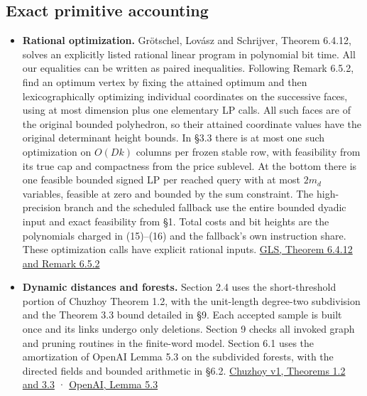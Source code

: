 \documentclass[11pt]{article}
\providecommand{\tightlist}{\setlength{\itemsep}{0pt}\setlength{\parskip}{0pt}}
\begin{document}
\hypertarget{exact-primitive-accounting}{%
\subsection{Exact primitive accounting}\label{exact-primitive-accounting}}

\begin{itemize}
\tightlist
\item
  \textbf{Rational optimization.} Grötschel, Lovász and Schrijver, Theorem 6.4.12, solves an explicitly listed rational linear program in polynomial bit time. All our equalities can be written as paired inequalities. Following Remark 6.5.2, find an optimum vertex by fixing the attained optimum and then lexicographically optimizing individual coordinates on the successive faces, using at most dimension plus one elementary LP calls. All such faces are of the original bounded polyhedron, so their attained coordinate values have the original determinant height bounds. In §3.3 there is at most one such optimization on \(O(Dk)\) columns per frozen stable row, with feasibility from its true cap and compactness from the price sublevel. At the bottom there is one feasible bounded signed LP per reached query with at most \(2m_d\) variables, feasible at zero and bounded by the sum constraint. The high-precision branch and the scheduled fallback use the entire bounded dyadic input and exact feasibility from §1. Total costs and bit heights are the polynomials charged in (15)--(16) and the fallback's own instruction share. These optimization calls have explicit rational inputs. \href{https://www.zib.de/userpage/groetschel/pubnew/paper/groetschellovaszschrijver1988.pdf\#page=192}{GLS, Theorem 6.4.12 and Remark 6.5.2}
\item
  \textbf{Dynamic distances and forests.} Section 2.4 uses the short-threshold portion of Chuzhoy Theorem 1.2, with the unit-length degree-two subdivision and the Theorem 3.3 bound detailed in §9. Each accepted sample is built once and its links undergo only deletions. Section 9 checks all invoked graph and pruning routines in the finite-word model. Section 6.1 uses the amortization of OpenAI Lemma 5.3 on the subdivided forests, with the directed fields and bounded arithmetic in §6.2. \href{https://arxiv.org/pdf/2109.05621v1}{Chuzhoy v1, Theorems 1.2 and 3.3} · \href{https://raw.githubusercontent.com/openai/math/adc7f1241b42e322a6451854ab7e4b4c146bf78a/preprints/Almost-Linear-Time-Maximum-Cardinality-Matching-in-Sparse-General-Graphs-September-24-2026/main.pdf\#page=37}{OpenAI, Lemma 5.3}

\end{itemize}
\end{document}
